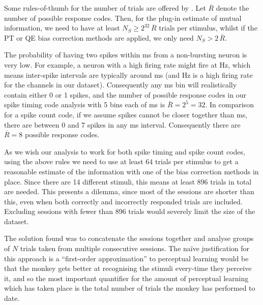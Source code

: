 Some rules-of-thumb for the number of trials are offered by \cite{Panzeri2007}.
Let $\overline{R}$ denote the number of possible response codes.
Then, for the plug-in estimate of mutual information, we need to have at least $N_S \ge 2^{32} \, \overline{R}$ trials per stimulus,
whilst if the \ac{PT} or \ac{QE} bias correction methods are applied, we only need $N_S > 2 \, \overline{R}$.

The probability of having two spikes within \unit[4]{ms} from a non-bursting neuron is very low. For example, a neuron with a high firing rate might fire at \unit[100]{Hz}, which means inter-spike intervals are typically around \unit[10]{ms} (and \unit[100]{Hz} is a high firing rate for the channels in our dataset).
Consequently any \unit[4]{ms} bin will realistically contain either 0 or 1 spikes, and the number of possible response codes in our spike timing code analysis with 5 bins each of \unit[4]{ms} is $\overline{R} = 2^5 = 32$. In comparison for a spike count code, if we assume spikes cannot be closer together than \unit[3]{ms}, there are between 0 and 7 spikes in any \unit[20]{ms} interval. Consequently there are $\overline{R} = 8$ possible response codes.

As we wish our analysis to work for both spike timing and spike count codes, using the above rules we need to use at least 64 trials per stimulus to get a reasonable estimate of the information with one of the bias correction methods in place.
Since there are 14 different stimuli, this means at least 896 trials in total are needed. This presents a dilemma, since most of the sessions are shorter than this, even when both correctly and incorrectly responded trials are included. Excluding sessions with fewer than 896 trials would severely limit the size of the dataset.

The solution found was to concatenate the sessions together and analyse groups of $N$ trials taken from multiple consecutive sessions.
The na\"{i}ve justification for this approach is a ``first-order approximation'' to perceptual learning would be that the monkey gets better at recognising the stimuli every-time they perceive it, and so the most important quantifier for the amount of perceptual learning which has taken place is the total number of trials the monkey has performed to date.


